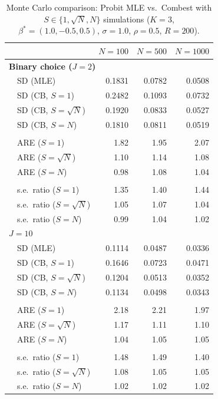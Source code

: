 \begin{table}[t]
\centering
\caption{Monte Carlo comparison: Probit MLE vs.\ Combest with $S \in \{1, \sqrt{N}, N\}$ simulations
($K=3$, $\beta^*=(1.0,-0.5,0.5)$, $\sigma=1.0$, $\rho=0.5$, $R=200$).}
\label{tab:unit_demand_efficiency}
\small
\begin{tabular}{llrrr}
\toprule
 & & $N=100$ & $N=500$ & $N=1000$ \\
\midrule
\multicolumn{5}{l}{\textbf{Binary choice ($J=2$)}} \\[2pt]
  & SD (MLE) & 0.1831 & 0.0782 & 0.0508 \\
  & SD (CB, $S{=}1$) & 0.2482 & 0.1093 & 0.0732 \\
  & SD (CB, $S{=}\sqrt{N}$) & 0.1920 & 0.0833 & 0.0527 \\
  & SD (CB, $S{=}N$) & 0.1810 & 0.0811 & 0.0519 \\
  \\[-4pt]
  & ARE ($S{=}1$) & 1.82 & 1.95 & 2.07 \\
  & ARE ($S{=}\sqrt{N}$) & 1.10 & 1.14 & 1.08 \\
  & ARE ($S{=}N$) & 0.98 & 1.08 & 1.04 \\
  \\[-4pt]
  & s.e.\ ratio ($S{=}1$) & 1.35 & 1.40 & 1.44 \\
  & s.e.\ ratio ($S{=}\sqrt{N}$) & 1.05 & 1.07 & 1.04 \\
  & s.e.\ ratio ($S{=}N$) & 0.99 & 1.04 & 1.02 \\
\midrule
\multicolumn{5}{l}{\textbf{$J=10$}} \\[2pt]
  & SD (MLE) & 0.1114 & 0.0487 & 0.0336 \\
  & SD (CB, $S{=}1$) & 0.1646 & 0.0723 & 0.0471 \\
  & SD (CB, $S{=}\sqrt{N}$) & 0.1204 & 0.0513 & 0.0352 \\
  & SD (CB, $S{=}N$) & 0.1134 & 0.0498 & 0.0343 \\
  \\[-4pt]
  & ARE ($S{=}1$) & 2.18 & 2.21 & 1.97 \\
  & ARE ($S{=}\sqrt{N}$) & 1.17 & 1.11 & 1.10 \\
  & ARE ($S{=}N$) & 1.04 & 1.05 & 1.05 \\
  \\[-4pt]
  & s.e.\ ratio ($S{=}1$) & 1.48 & 1.49 & 1.40 \\
  & s.e.\ ratio ($S{=}\sqrt{N}$) & 1.08 & 1.05 & 1.05 \\
  & s.e.\ ratio ($S{=}N$) & 1.02 & 1.02 & 1.02 \\
\bottomrule
\end{tabular}
\end{table}